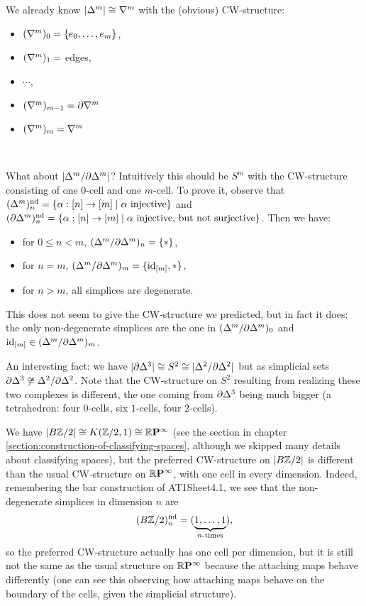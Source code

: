 \begin{example}
We already know $|\Delta^m|\cong\nabla^{m}$ with the (obvious) CW-structure:
\begin{itemize}[label={-}]
    \item $(\nabla^{m})_0=\{{{e}_0,\dots,{e}_{m}}\}$,
    \item $(\nabla^{m})_1=$ edges,
    \item $\cdots$,
    \item $(\nabla^{m})_{m-1}=\partial\nabla^{m}$
    \item $(\nabla^{m})_m=\nabla^{m}$
\end{itemize}\ 

What about $|\Delta^m/\partial\Delta^m|$? Intuitively this should be $S^m$ with the CW-structure consisting of one $0$-cell and one $m$-cell. To prove it, observe that $(\Delta^m)_n^\text{nd}=\{\alpha:[n]\to[m]\mid\alpha\text{ injective}\}$ and $(\partial\Delta^m)_n^\text{nd}=\{\alpha:[n]\to[m]\mid\alpha\text{ injective, but not surjective}\}$. Then we have:
\begin{itemize}[label={-}]
    \item for $0\le n<m$, $(\Delta^m/\partial\Delta^m)_n=\{*\}$,
    \item for $n=m$, $(\Delta^m/\partial\Delta^m)_m=\{\operatorname{id}_{[m]},*\}$,
    \item for $n>m$, all simplices are degenerate.
\end{itemize}
This does not seem to give the CW-structure we predicted, but in fact it does: the only non-degenerate simplices are the one in $(\Delta^m/\partial\Delta^m)_0$ and $\operatorname{id}_{[m]}\in(\Delta^m/\partial\Delta^m)_m$.
\end{example}

\begin{example}
An interesting fact: we have $|\partial\Delta^3|\cong S^2\cong|\Delta^2/\partial\Delta^2|$ but as simplicial sets $\partial\Delta^3\not\cong\Delta^2/\partial\Delta^2$. Note that the CW-structure on $S^2$ resulting from realizing these two complexes is different, the one coming from $\partial\Delta^3$ being much bigger (a tetrahedron: four $0$-cells, six $1$-cells, four $2$-cells).
\end{example}

\begin{example}
We have $|B{\mathbb Z}/2|\cong K({\mathbb Z}/2,1)\cong{{\mathbb R}\mathbf{P}^{\infty}}$ (see the section in chapter \ref{section:construction-of-classifying-spaces}, although we skipped many details about classifying spaces), but the preferred CW-structure on $|B{\mathbb Z}/2|$ is different than the usual CW-structure on ${{\mathbb R}\mathbf{P}^{\infty}}$, with one cell in every dimension. Indeed, remembering the bar construction of AT1Sheet4.1, we see that the non-degenerate simplices in dimension $n$ are \[(B{\mathbb Z}/2)_n^\text{nd}=(\underbrace{1,\dots,1}_{n\text{-times}}),\] so the preferred CW-structure actually has one cell per dimension, but it is still not the same as the usual structure on ${{\mathbb R}\mathbf{P}^{\infty}}$ because the attaching maps behave differently (one can see this observing how attaching maps behave on the boundary of the cells, given the simplicial structure).
\end{example}

